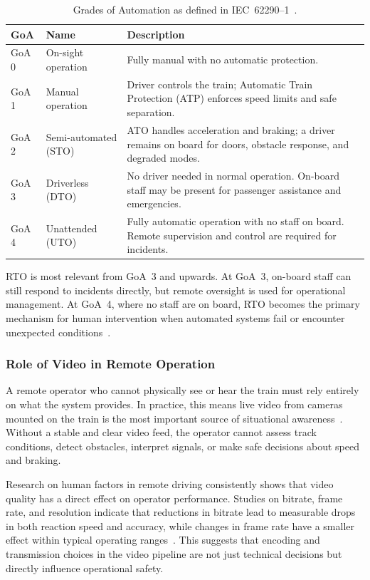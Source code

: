 \begin{table}[h]
\centering
\caption{Grades of Automation as defined in IEC~62290--1~\cite{iec62290, uitp2018}.}\label{tab:goa}
    \begin{tabular}{p{1cm} p{3cm} p{8cm}}
    \toprule
    \textbf{GoA} & \textbf{Name} & \textbf{Description} \\
    \midrule
    GoA 0 & On-sight operation   & Fully manual with no automatic protection.\\
    GoA 1 & Manual operation     & Driver controls the train; Automatic Train Protection (ATP) enforces speed limits and safe separation.\\
    GoA 2 & Semi-automated (STO) & ATO handles acceleration and braking; a driver remains on board for doors, obstacle response, and degraded modes.\\
    GoA 3 & Driverless (DTO)     & No driver needed in normal operation. On-board staff may be present for passenger assistance and emergencies. \\
    GoA 4 & Unattended (UTO)     & Fully automatic operation with no staff on board. Remote supervision and control are required for incidents. \\
    \bottomrule
    \end{tabular}
\end{table}
 
RTO is most relevant from GoA~3 and upwards. At GoA~3, on-board staff can still respond to incidents directly, but remote oversight is used for operational management. At GoA~4, where no staff are on board, RTO becomes the primary mechanism for human intervention when automated systems fail or encounter unexpected conditions~\cite{europesrail2025_d3, orr2024}.
 
\subsubsection{Role of Video in Remote Operation}\label{subsec:video-role}

A remote operator who cannot physically see or hear the train must rely entirely on what the system provides. In practice, this means live video from cameras mounted on the train is the most important source of situational awareness~\cite{brandenburger2023, kozarevic2025}. Without a stable and clear video feed, the operator cannot assess track conditions, detect obstacles, interpret signals, or make safe decisions about speed and braking.
 
Research on human factors in remote driving consistently shows that video quality has a direct effect on operator performance. Studies on bitrate, frame rate, and resolution indicate that reductions in bitrate lead to measurable drops in both reaction speed and accuracy, while changes in frame rate have a smaller effect within typical operating ranges~\cite{brandenburger2023}. This suggests that encoding and transmission choices in the video pipeline are not just technical decisions but directly influence operational safety.

